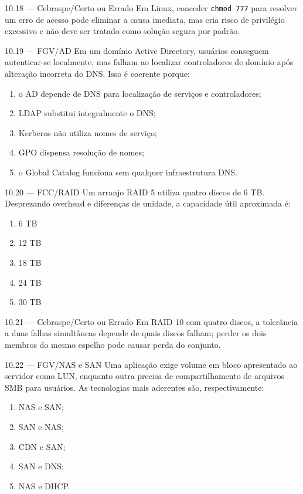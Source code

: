 \begin{questao}{ 10.18 — Cebraspe/Certo ou Errado}
Em Linux, conceder \texttt{chmod 777} para resolver um erro de acesso pode eliminar a causa imediata, mas cria risco de privilégio excessivo e não deve ser tratado como solução segura por padrão.
\end{questao}

\begin{questao}{ 10.19 — FGV/AD}
Em um domínio Active Directory, usuários conseguem autenticar-se localmente, mas falham ao localizar controladores de domínio após alteração incorreta do DNS. Isso é coerente porque:
\begin{enumerate}[label=\Alph*)]
\item o AD depende de DNS para localização de serviços e controladores;
\item LDAP substitui integralmente o DNS;
\item Kerberos não utiliza nomes de serviço;
\item GPO dispensa resolução de nomes;
\item o Global Catalog funciona sem qualquer infraestrutura DNS.
\end{enumerate}
\end{questao}

\begin{questao}{ 10.20 — FCC/RAID}
Um arranjo RAID 5 utiliza quatro discos de 6 TB. Desprezando overhead e diferenças de unidade, a capacidade útil aproximada é:
\begin{enumerate}[label=\Alph*)]
\item 6 TB
\item 12 TB
\item 18 TB
\item 24 TB
\item 30 TB
\end{enumerate}
\end{questao}

\begin{questao}{ 10.21 — Cebraspe/Certo ou Errado}
Em RAID 10 com quatro discos, a tolerância a duas falhas simultâneas depende de quais discos falham; perder os dois membros do mesmo espelho pode causar perda do conjunto.
\end{questao}

\begin{questao}{ 10.22 — FGV/NAS e SAN}
Uma aplicação exige volume em bloco apresentado ao servidor como LUN, enquanto outra precisa de compartilhamento de arquivos SMB para usuários. As tecnologias mais aderentes são, respectivamente:
\begin{enumerate}[label=\Alph*)]
\item NAS e SAN;
\item SAN e NAS;
\item CDN e SAN;
\item SAN e DNS;
\item NAS e DHCP.
\end{enumerate}
\end{questao}

